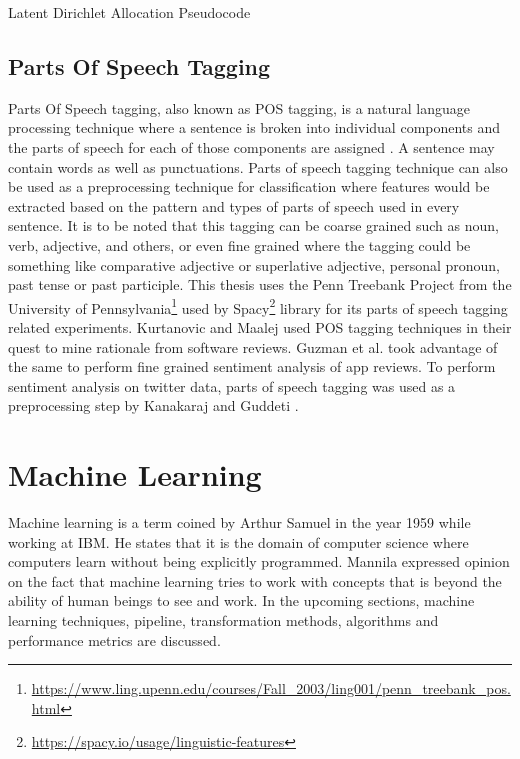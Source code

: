 \documentclass[a4paper,12pt,twoside]{report}
\begin{document}
\begin{algorithm}
\caption{Latent Dirichlet Allocation Pseudocode}
\begin{algorithmic}[1]
	\State {}
    	\State {}
    \EndFor
\EndFor
\State {}
\EndProcedure
\end{algorithmic}
\end{algorithm}

\subsection{Parts Of Speech Tagging}
Parts Of Speech tagging, also known as \acs{POS} tagging, is a natural language processing technique where a sentence is broken into individual components and the parts of speech for each of those components are assigned \cite{Jurafsky2017}. A sentence may contain words as well as punctuations. Parts of speech tagging technique can also be used as a preprocessing technique for classification where features would be extracted based on the pattern and types of parts of speech used in every sentence. It is to be noted that this tagging can be coarse grained such as noun, verb, adjective, and others, or even fine grained where the tagging could be something like comparative adjective or superlative adjective, personal pronoun, past tense or past participle. This thesis uses the Penn Treebank Project from the University of Pennsylvania\footnote{\url{https://www.ling.upenn.edu/courses/Fall_2003/ling001/penn_treebank_pos.html}} used by Spacy\footnote{\url{https://spacy.io/usage/linguistic-features}} library for its parts of speech tagging related experiments.
\newline \newline
Kurtanovic and Maalej \cite{Kurtanovic2017} used \acs{POS} tagging techniques in their quest to mine rationale from software reviews. Guzman et al.\cite{Guzman2015} took advantage of the same to perform fine grained sentiment analysis of app reviews. To perform sentiment analysis on twitter data, parts of speech tagging was used as a preprocessing step by Kanakaraj and Guddeti \cite{Kanakaraj2015}.


\section{Machine Learning}
Machine learning is a term coined by Arthur Samuel in the year 1959 \cite{Samuel1959a} while working at IBM. He states that it is the domain of computer science where computers learn without being explicitly programmed. Mannila \cite{Mannila1996a} expressed opinion on the fact that machine learning tries to work with concepts that is beyond the ability of human beings to see and work. In the upcoming sections, machine learning techniques, pipeline, transformation methods, algorithms and performance metrics are discussed. 
\end{document}
